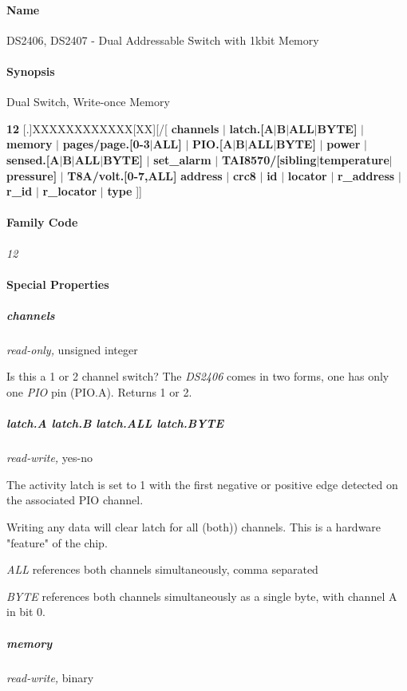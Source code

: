 \paragraph*{Name}
DS2406, DS2407 - Dual Addressable Switch with 1kbit Memory

\paragraph*{Synopsis}
Dual Switch, Write-once Memory 

\textbf{12} [.]XXXXXXXXXXXX[XX][/[ \textbf{channels}
$|$ \textbf{latch.[A$|$B$|$ALL$|$BYTE]} $|$ \textbf{memory} $|$ \textbf{pages/page.[0-3$|$ALL]} $|$ \textbf{PIO.[A$|$B$|$ALL$|$BYTE]} $|$ \textbf{power} $|$ \textbf{sensed.[A$|$B$|$ALL$|$BYTE]}
$|$ \textbf{set\_alarm} $|$ \textbf{TAI8570/[sibling$|$temperature$|$pressure]} $|$ \textbf{T8A/volt.[0-7,ALL]}    
      \textbf{address} $|$ \textbf{crc8} $|$ \textbf{id} $|$ \textbf{locator} $|$ \textbf{r\_address} $|$ \textbf{r\_id} $|$ \textbf{r\_locator} $|$ \textbf{type}  ]]

\paragraph*{Family Code}


\textit{12} 
\paragraph*{Special Properties}

\subparagraph*{channels}\textit{read-only,} unsigned integer 

Is this a 1 or 2 channel switch? The \textit{DS2406} comes in two forms, one has
only one \textit{PIO} pin (PIO.A). Returns 1 or 2. 
\subparagraph*{latch.A latch.B latch.ALL latch.BYTE}\textit{read-write,}
yes-no 

The activity latch is set to 1 with the first negative or positive edge
detected on the associated PIO channel. 

Writing any data will clear latch for all (both)) channels. This is a hardware
"feature" of the chip. 

\textit{ALL} references both channels simultaneously, comma separated 

\textit{BYTE} references both channels simultaneously as a single byte, with channel
A in bit 0. 
\subparagraph*{memory}\textit{read-write,} binary 


